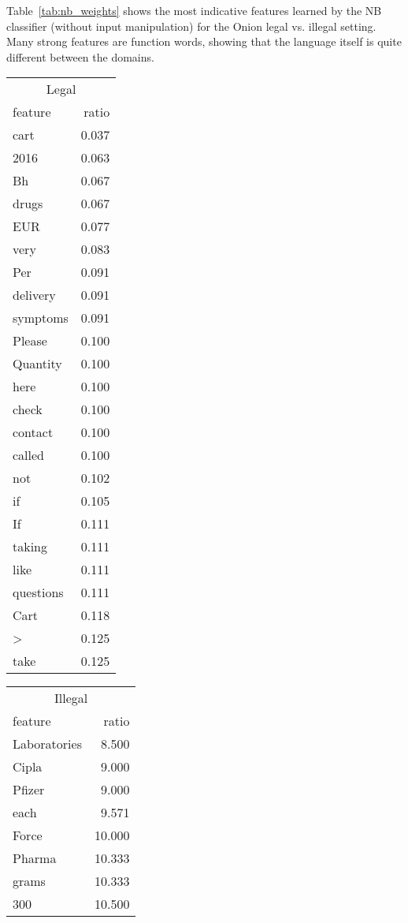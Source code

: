 \documentclass[11pt,a4paper,table]{article}
\begin{document}
Table~\ref{tab:nb_weights} shows the most indicative features learned
by the NB classifier (without input manipulation) for the Onion
legal vs. illegal setting.
Many strong features are function words, showing that the language itself
is quite different between the domains.

\begin{table}
\small
\begin{tabular}{lr}
\multicolumn{2}{c}{Legal}\\
feature & ratio\\
\hline
cart & 0.037\\
2016 & 0.063\\
Bh & 0.067\\
drugs & 0.067\\
EUR & 0.077\\
very & 0.083\\
Per & 0.091\\
delivery & 0.091\\
symptoms & 0.091\\
Please & 0.100\\
Quantity & 0.100\\
here & 0.100\\
check & 0.100\\
contact & 0.100\\
called & 0.100\\
not & 0.102\\
if & 0.105\\
If & 0.111\\
taking & 0.111\\
like & 0.111\\
questions & 0.111\\
Cart & 0.118\\
> & 0.125\\
take & 0.125\\
\end{tabular}
\begin{tabular}{lr}
\multicolumn{2}{c}{Illegal}\\
feature & ratio\\
\hline
Laboratories & 8.500\\
Cipla & 9.000\\
Pfizer & 9.000\\
each & 9.571\\
Force & 10.000\\
Pharma & 10.333\\
grams & 10.333\\
300 & 10.500\\

\end{tabular}
\end{table}
\end{document}
